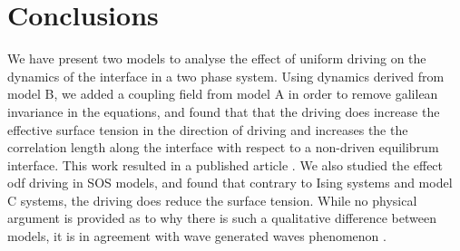     \section{Conclusions}

We have present two models to analyse the effect of uniform driving on the dynamics of the interface in a two phase system. Using dynamics derived from model B\cite{bray_interface_2001,bray_interface_2001-1}, we added a coupling field from model A in order to remove galilean invariance in the equations, and found that that the driving does increase the effective surface tension in the direction of driving and increases the the correlation length along the interface with respect to a non-driven equilibrum interface. This work resulted in a published article \cite{dean_effect_2020}.
We also studied the effect odf driving in SOS models, and found that contrary to Ising systems \cite{smith_interfaces_2008-1} and model C systems, the driving does reduce the surface tension. While no physical argument is provided as to why there is such a qualitative difference between models, it is in agreement with wave generated waves phenomenon \cite{maat_roughness_1991}.